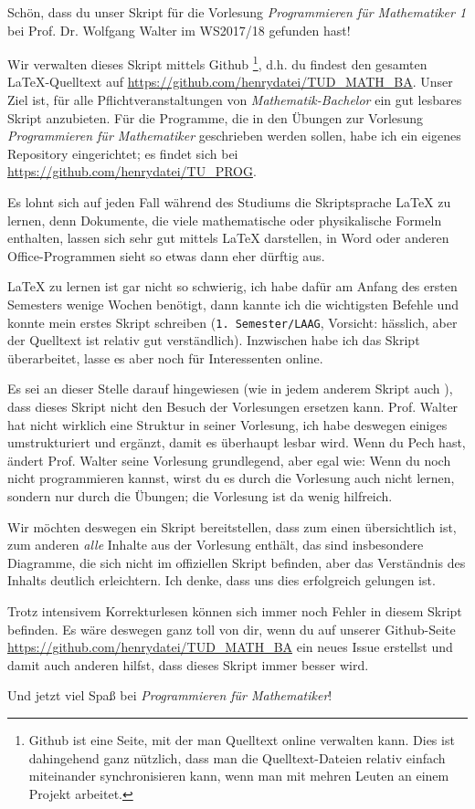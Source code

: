 Schön, dass du unser Skript für die Vorlesung \textit{Programmieren für Mathematiker 1} bei Prof. Dr. Wolfgang Walter im WS2017/18 gefunden hast!

Wir verwalten dieses Skript mittels Github \footnote{Github ist eine Seite, mit der man Quelltext online verwalten kann. Dies ist dahingehend ganz nützlich, dass man die Quelltext-Dateien relativ einfach miteinander synchronisieren kann, wenn man mit mehren Leuten an einem Projekt arbeitet.}, d.h. du findest den gesamten \LaTeX-Quelltext auf \url{https://github.com/henrydatei/TUD_MATH_BA}. Unser Ziel ist, für alle Pflichtveranstaltungen von \textit{Mathematik-Bachelor} ein gut lesbares Skript anzubieten. Für die Programme, die in den Übungen zur Vorlesung \textit{Programmieren für Mathematiker} geschrieben werden sollen, habe ich ein eigenes Repository eingerichtet; es findet sich bei \url{https://github.com/henrydatei/TU_PROG}.

Es lohnt sich auf jeden Fall während des Studiums die Skriptsprache \LaTeX{} zu lernen, denn Dokumente, die viele mathematische oder physikalische Formeln enthalten, lassen sich sehr gut mittels \LaTeX{} darstellen, in Word oder anderen Office-Programmen sieht so etwas dann eher dürftig aus.

\LaTeX{} zu lernen ist gar nicht so schwierig, ich habe dafür am Anfang des ersten Semesters wenige Wochen benötigt, dann kannte ich die wichtigsten Befehle und konnte mein erstes Skript schreiben (\texttt{1. Semester/LAAG}, Vorsicht: hässlich, aber der Quelltext ist relativ gut verständlich). Inzwischen habe ich das Skript überarbeitet, lasse es aber noch für Interessenten online.

Es sei an dieser Stelle darauf hingewiesen (wie in jedem anderem Skript auch \smiley{}), dass dieses Skript nicht den Besuch der Vorlesungen ersetzen kann. Prof. Walter hat nicht wirklich eine Struktur in seiner Vorlesung, ich habe deswegen einiges umstrukturiert und ergänzt, damit es überhaupt lesbar wird. Wenn du Pech hast, ändert Prof. Walter seine Vorlesung grundlegend, aber egal wie: Wenn du noch nicht programmieren kannst, wirst du es durch die Vorlesung auch nicht lernen, sondern nur durch die Übungen; die Vorlesung ist da wenig hilfreich.

Wir möchten deswegen ein Skript bereitstellen, dass zum einen übersichtlich ist, zum anderen \textit{alle} Inhalte aus der Vorlesung enthält, das sind insbesondere Diagramme, die sich nicht im offiziellen Skript befinden, aber das Verständnis des Inhalts deutlich erleichtern. Ich denke, dass uns dies erfolgreich gelungen ist.

Trotz intensivem Korrekturlesen können sich immer noch Fehler in diesem Skript befinden. Es wäre deswegen ganz toll von dir, wenn du auf unserer Github-Seite \url{https://github.com/henrydatei/TUD_MATH_BA} ein neues Issue erstellst und damit auch anderen hilfst, dass dieses Skript immer besser wird.

Und jetzt viel Spaß bei \textit{Programmieren für Mathematiker}!